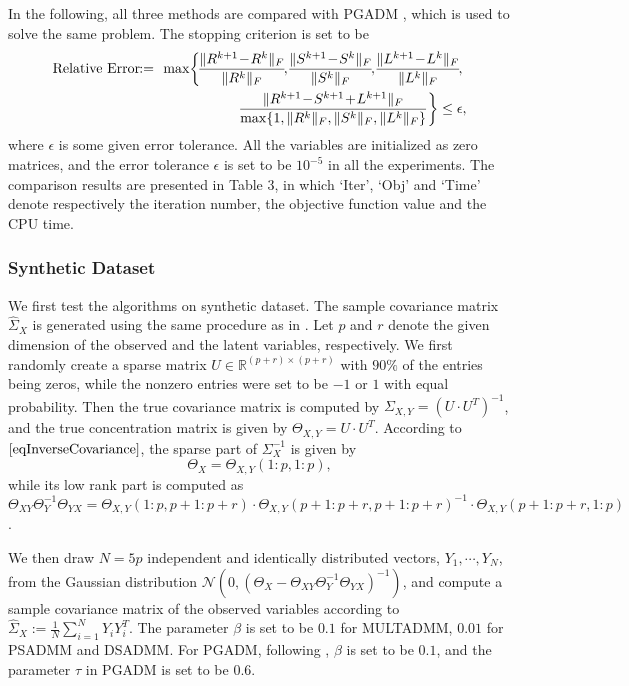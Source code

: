 \documentclass{mcom-l}
\theoremstyle{definition}
\theoremstyle{remark}
\numberwithin{equation}{section}
\begin{document}
In the following, all three methods are compared with PGADM \cite{MaXueZou2012}, which is used to solve the same problem. The stopping criterion is set to be
{\small\begin{eqnarray}
\hbox{Relative Error}\!\!&:=&\!\!\max\!\left\{\! \frac{\|R^{k+1} \!-\! R^k \|_F}{\|R^k\|_F}\!,\!\frac{\|S^{k+1} \!-\! S^k \|_F}{\|S^k\|_F}\!,\!\frac{\|L^{k+1} \!-\! L^k \|_F}{\|L^k\|_F}\!,\right.\nonumber\\
&&\qquad\quad\left. \frac{\|R^{k+1} \!-\! S^{k+1} \!+\! L^{k+1}\|_F}{\max\{ 1,\|R^k\|_F,\|S^k\|_F,\|L^k\|_F \}}\right\} \le \epsilon,\nonumber
\end{eqnarray}}
where $\epsilon$ is some given error tolerance. All the variables are initialized as zero matrices, and the error tolerance $\epsilon$ is set to be $10^{-5}$ in all the  experiments. The comparison results are presented in Table 3, in which `Iter', `Obj' and `Time' denote respectively the iteration number, the objective function value and the CPU time.

\subsubsection{Synthetic Dataset}

We first test the algorithms on synthetic dataset. The sample covariance matrix $\hat{\Sigma}_X$ is generated using the same procedure as in \cite{MaXueZou2012}. Let $p$ and $r$ denote the given dimension of the observed and the latent variables, respectively. We first randomly create a sparse matrix $U \in \mathbb{R}^{(p+r)\times (p+r)}$ with $90\%$ of the entries being zeros, while the nonzero entries were set to be $-1$ or $1$ with equal probability. Then the true covariance matrix is computed by $\Sigma_{X,Y} = (U\cdot U^T)^{-1}$, and the true concentration matrix is given by $\Theta_{X,Y}=U\cdot U^T$. According to $\eqref{eqInverseCovariance}$, the sparse part of ${\Sigma}^{-1}_X$ is given by $$\Theta_X=\Theta_{X,Y}(1:p,1:p),$$
while its low rank part is computed as $\Theta_{XY} \Theta_Y^{-1}\Theta_{YX}=\Theta_{X,Y}(1:p, p+1:p+r)\cdot \Theta_{X,Y}(p+1 : p+r, p+1 : p+r)^{-1}\cdot \Theta_{X,Y}(p+1 : p+r, 1 : p)$.

We then draw $N = 5p$ independent and identically distributed vectors, $Y_1,\cdots ,Y_N$, from the Gaussian distribution ${\mathcal{N}}(0, (\Theta_X - \Theta_{XY} \Theta_Y^{-1}\Theta_{YX})^{-1})$, and compute a sample covariance matrix of  the observed variables according to $\hat{\Sigma}_X:= \frac{1}{N}\sum_{i=1}^N Y_i Y_i^T$. The parameter $\beta$ is set to be $0.1$ for MULTADMM, $0.01$ for PSADMM and DSADMM. For PGADM, following \cite{MaXueZou2012}, $\beta$ is set to be $0.1$, and the parameter $\tau$ in PGADM is set to be $0.6$.
\end{document}
